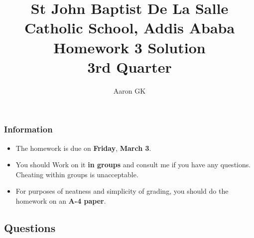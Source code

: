 \documentclass[9pt,addpoints]{exam}
\author{Aaron GK}
\begin{document}
	\title{St John Baptist De La Salle Catholic School, Addis Ababa\\
		\large Homework 3 Solution \\
		3rd Quarter}
	\maketitle
	\begin{center}
		\subsubsection*{Information}
		\begin{itemize}
			\item The homework is due on \textbf{Friday}, \textbf{March 3}.
			\item You should Work on it \textbf{in groups} and consult me if you have any questions. Cheating within groups is unacceptable.
			\item For purposes of neatness and simplicity of grading, you should do the homework on an \textbf{A-4 paper}.
		\end{itemize}
	\end{center}
	\begin{center}
		\subsection*{Questions}
	\end{center}
	
\end{document}
